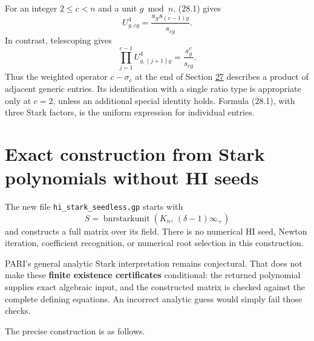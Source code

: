 \documentclass[11pt,reqno]{amsart}
\theoremstyle{plain}
\begin{document}
For an integer \(2\le c<n\) and a unit \(g\bmod n\), (28.1) gives
\[
 U_{g,cg}^4=\frac{s_gs_{(c-1)g}}{s_{cg}}.
\]
In contrast, telescoping gives
\begin{equation*}
 \boxed{
 \prod_{j=1}^{c-1}U_{g,(j+1)g}^4=\frac{s_g^c}{s_{cg}}.
 }
 \tag{28.2}
\end{equation*}
Thus the weighted operator \(c-\sigma_c\) at the end of Section \hyperref[sec:27]{27}
describes a product of adjacent generic entries. Its identification with
a single ratio type is appropriate only at \(c=2\), unless an additional
special identity holds. Formula (28.1), with three Stark factors, is the
uniform expression for individual entries.

\section{Exact construction from Stark polynomials without HI seeds}\label{sec:29}

The new file \texttt{hi\_\allowbreak stark\_\allowbreak seedless.gp} starts with
\[
 S=\operatorname{bnrstarkunit}
 \left(K_n,\,(\delta-1)\infty_+\right)
\]
and constructs a full matrix over its field. There is no numerical HI
seed, Newton iteration, coefficient recognition, or numerical root
selection in this construction.

PARI's general analytic Stark interpretation remains conjectural. That
does not make these \textbf{finite existence certificates} conditional:
the returned polynomial supplies exact algebraic input, and the
constructed matrix is checked against the complete defining equations.
An incorrect analytic guess would simply fail those checks.

The precise construction is as follows.
\end{document}
